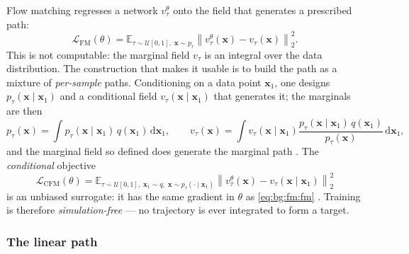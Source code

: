 \documentclass[headsepline,footsepline,footinclude=false,oneside,fontsize=11pt,paper=a4,listof=totoc,bibliography=totoc]{scrbook}
\theoremstyle{definition}
\theoremstyle{plain}
\theoremstyle{remark}
\newcommand{\vect}[1]{\boldsymbol{#1}}
\newcommand{\sidx}[1]{_{\textrm{#1}}}
\newcommand{\E}{\mathbb{E}}                    %
\newcommand{\Unif}{\mathcal{U}}                %
\newcommand{\dd}{\mathrm{d}}                   %
\newcommand{\vfield}{v}                        %
\newcommand{\ftime}{\tau}                      %
\begin{document}
Flow matching \parencite[Eq.~(5)]{lipman2023flow} regresses a network $\vfield_{\ftime}^{\theta}$ onto the
field that generates a prescribed path:
\begin{equation}\label{eq:bg:fm:fm}
  \mathcal{L}\sidx{FM}(\theta)
  = \E_{\ftime\sim\Unif[0,1],\;\vect{x}\sim p_{\ftime}}
    \left\|\vfield_{\ftime}^{\theta}(\vect{x}) - \vfield_{\ftime}(\vect{x})\right\|_{2}^{2}.
\end{equation}
This is not computable: the marginal field $\vfield_{\ftime}$ is an integral over the data
distribution. The construction that makes it usable is to build the path as a mixture of
\emph{per-sample} paths. Conditioning on a data point $\vect{x}_{1}$, one designs
$p_{\ftime}(\vect{x}\mid\vect{x}_{1})$ and a conditional field
$\vfield_{\ftime}(\vect{x}\mid\vect{x}_{1})$ that generates it; the marginals are then
\begin{equation}\label{eq:bg:fm:marginal}
  p_{\ftime}(\vect{x}) = \int p_{\ftime}(\vect{x}\mid\vect{x}_{1})\,q(\vect{x}_{1})\,\dd\vect{x}_{1},
  \qquad
  \vfield_{\ftime}(\vect{x}) = \int \vfield_{\ftime}(\vect{x}\mid\vect{x}_{1})
    \frac{p_{\ftime}(\vect{x}\mid\vect{x}_{1})\,q(\vect{x}_{1})}{p_{\ftime}(\vect{x})}\,\dd\vect{x}_{1},
\end{equation}
and the marginal field so defined does generate the marginal path
\parencite[Theorem~1]{lipman2023flow}. The \emph{conditional} objective
\begin{equation}\label{eq:bg:fm:cfm}
  \mathcal{L}\sidx{CFM}(\theta)
  = \E_{\ftime\sim\Unif[0,1],\;\vect{x}_{1}\sim q,\;\vect{x}\sim p_{\ftime}(\cdot\mid\vect{x}_{1})}
    \left\|\vfield_{\ftime}^{\theta}(\vect{x}) - \vfield_{\ftime}(\vect{x}\mid\vect{x}_{1})\right\|_{2}^{2}
\end{equation}
is an unbiased surrogate: it has the same gradient in $\theta$ as \eqref{eq:bg:fm:fm}
\parencite[Theorem~2]{lipman2023flow}. Training is therefore \emph{simulation-free} --- no
trajectory is ever integrated to form a target.

\subsubsection*{The linear path}
\end{document}
